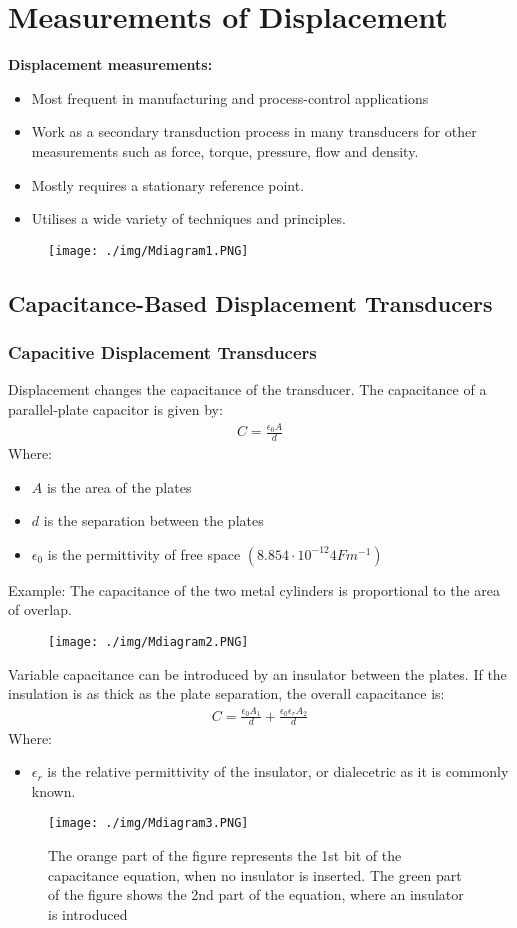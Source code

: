 \chapter{Measurements of Displacement}
\textbf{Displacement measurements:}
\begin{itemize}
  \item Most frequent in manufacturing and process-control applications
  \item Work as a secondary transduction process in many transducers for other measurements such as force, torque, pressure, flow and density.
  \item Mostly requires a stationary reference point.
  \item Utilises a wide variety of techniques and principles.
\end{itemize}
\begin{figure}[H]
  \centering
  \texttt{[image: ./img/Mdiagram1.PNG]}
\end{figure}
\section{Capacitance-Based Displacement Transducers}
\subsection{Capacitive Displacement Transducers}
Displacement changes the capacitance of the transducer. The capacitance of a parallel-plate capacitor is given by:
\begin{gather}
  C = \frac{\epsilon_0A}{d}
\end{gather}
Where:
\begin{itemize}
  \item $A$ is the area of the plates
  \item $d$ is the separation between the plates
  \item $\epsilon_0$ is the permittivity of free space $(8.854 \cdot 10^{-12}4 Fm^{-1})$
\end{itemize}
Example: The capacitance of the two metal cylinders is proportional to the area of overlap.
\begin{figure}[H]
  \centering
  \texttt{[image: ./img/Mdiagram2.PNG]}
\end{figure}
Variable capacitance can be introduced by an insulator between the plates. If the insulation is as thick as the plate separation, the overall capacitance is:
\begin{gather}
  C = \frac{\epsilon_0A_1}{d} + \frac{\epsilon_0\epsilon_rA_2}{d}
\end{gather}
Where:
\begin{itemize}
  \item $\epsilon_r$ is the relative permittivity of the insulator, or dialecetric as it is commonly known.
\end{itemize}
\begin{figure}[H]
  \centering
  \texttt{[image: ./img/Mdiagram3.PNG]}
  \caption{The orange part of the figure represents the 1st bit of the capacitance equation, when no insulator is inserted. The green part of the figure shows the 2nd part of the equation, where an insulator is introduced}
\end{figure}
